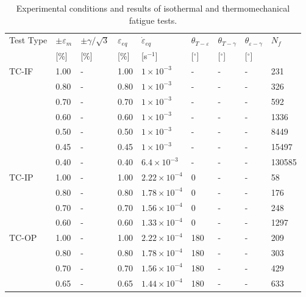 \documentclass[preprint,5p,twocolumn,11pt,sort&compress]{elsarticle}
\begin{document}
\begin{table*}[htbp]
  \centering
  \caption{Experimental conditions and results of isothermal and thermomechanical fatigue tests.} \vspace{0.1cm}
    \begin{tabular}{p{2cm}p{1.5cm}p{1.5cm}p{1.5cm}p{2.5cm}p{1cm}p{1cm}p{1cm}p{1cm}}
    \hline
    Test Type & $\pm \varepsilon _m$ & $\pm \gamma/ \sqrt 3$ & $\varepsilon _{eq}$ & $\dot \varepsilon _{eq}$ & $\theta_{T-\varepsilon}$ & $\theta_{T-\gamma}$ & $\theta_{\varepsilon-\gamma}$ & $N_f$ \\
          & [\%]  & [\%]  & [\%]  & [s$^{-1}$] & [$^\circ$] & [$^\circ$] & [$^\circ$] &  \\
    \hline
    TC-IF & 1.00  & -     & 1.00  & $1\times 10^{-3}$ & -     & -     & -     & 231 \\
          & 0.80  & -     & 0.80  & $1\times 10^{-3}$ & -     & -     & -     & 326 \\
          & 0.70  & -     & 0.70  & $1\times 10^{-3}$ & -     & -     & -     & 592 \\
          & 0.60  & -     & 0.60  & $1\times 10^{-3}$ & -     & -     & -     & 1336 \\
          & 0.50  & -     & 0.50  & $1\times 10^{-3}$ & -     & -     & -     & 8449 \\
          & 0.45  & -     & 0.45  & $1\times 10^{-3}$ & -     & -     & -     & 15497 \\
          & 0.40  & -     & 0.40  & $6.4\times 10^{-3}$ & -     & -     & -     & 130585 \\
    \hline
    TC-IP & 1.00  & -     & 1.00  & $2.22\times 10^{-4}$ & 0     & -     & -     & 58 \\
          & 0.80  & -     & 0.80  & $1.78\times 10^{-4}$ & 0     & -     & -     & 176 \\
          & 0.70  & -     & 0.70  & $1.56\times 10^{-4}$ & 0     & -     & -     & 248 \\
          & 0.60  & -     & 0.60  & $1.33\times 10^{-4}$ & 0     & -     & -     & 1297 \\
    \hline
    TC-OP & 1.00  & -     & 1.00  & $2.22\times 10^{-4}$ & 180   & -     & -     & 209 \\
          & 0.80  & -     & 0.80  & $1.78\times 10^{-4}$ & 180   & -     & -     & 303 \\
          & 0.70  & -     & 0.70  & $1.56\times 10^{-4}$ & 180   & -     & -     & 429 \\
          & 0.65  & -     & 0.65  & $1.44\times 10^{-4}$ & 180   & -     & -     & 633 \\

\end{tabular}
\end{table*}
\end{document}
